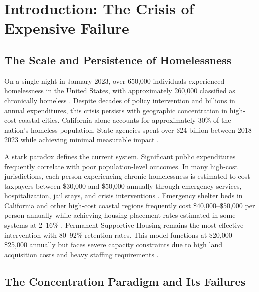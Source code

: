 \documentclass[12pt, letterpaper]{article}
\begin{document}
\newpage
\begingroup
{}
\setlength{\cftbeforesecskip}{2pt}
\setlength{\cftbeforesubsecskip}{-2pt}
\tableofcontents
\endgroup

\newpage
{}



\section{Introduction: The Crisis of Expensive Failure}

\subsection{The Scale and Persistence of Homelessness}

On a single night in January 2023, over 650,000 individuals experienced homelessness in the United States, with approximately 260,000 classified as chronically homeless \citep{hud_ahar_2023}. Despite decades of policy intervention and billions in annual expenditures, this crisis persists with geographic concentration in high-cost coastal cities. California alone accounts for approximately 30\% of the nation's homeless population. State agencies spent over \$24 billion between 2018--2023 while achieving minimal measurable impact \citep{lao_2023}.

A stark paradox defines the current system. Significant public expenditures frequently correlate with poor population-level outcomes. In many high-cost jurisdictions, each person experiencing chronic homelessness is estimated to cost taxpayers between \$30,000 and \$50,000 annually through emergency services, hospitalization, jail stays, and crisis interventions \citep{greendoors_2024, culhane_metraux_hadley_2002}. Emergency shelter beds in California and other high-cost coastal regions frequently cost \$40,000--\$50,000 per person annually while achieving housing placement rates estimated in some systems at 2--16\% \citep{guardian_2024, maine_housing_2023}. Permanent Supportive Housing remains the most effective intervention with 80--92\% retention rates. This model functions at \$20,000--\$25,000 annually but faces severe capacity constraints due to high land acquisition costs and heavy staffing requirements \citep{berkeley_2023}.

\subsection{The Concentration Paradigm and Its Failures}
\end{document}
